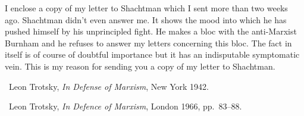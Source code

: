 \triast
\vspace*{-1 \baselineskip}


\vspace*{-1\baselineskip}


I enclose a copy of my letter to Shachtman which I sent more than two weeks ago. Shachtman didn’t even answer me. It shows the mood into which he has pushed himself by his unprincipled fight. He makes a bloc with the anti-Marxist Burnham and he refuses to answer my letters concerning this bloc. The fact in itself is of course of doubtful importance but it has an indisputable symptomatic vein. This is my reason for sending you a copy of my letter to Shachtman.

\enlargethispage{\baselineskip}


\begin{letterinfo}
	\firstpublished\ Leon Trotsky, \emph{In Defense of Marxism}, New York 1942.
	
	\checkedagainst\ Leon Trotsky, \emph{In Defence of Marxism}, London 1966, pp.~83--88.
\end{letterinfo}

